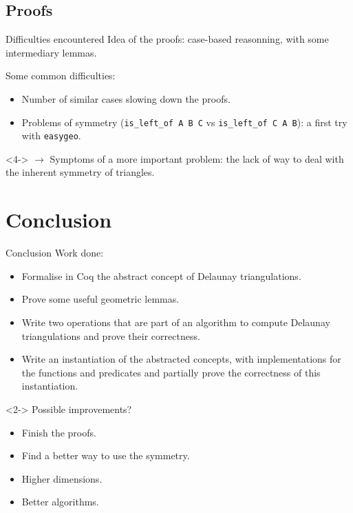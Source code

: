 \documentclass[18pt]{beamer}
\begin{document}
\subsection{Proofs}

\begin{frame}{Difficulties encountered}
Idea of the proofs: case-based reasonning, with some intermediary lemmas.

Some common difficulties:
\begin{itemize}
 \item<2-> Number of similar cases slowing down the proofs.
 \item<3-> Problems of symmetry ({\tt is\_left\_of A B C} vs {\tt is\_left\_of C A B}): a first try with {\tt easygeo}.
\end{itemize}

\begin{uncoverenv}<4->
$\rightarrow$ Symptoms of a more important problem: the lack of way to deal with the inherent symmetry of triangles.
\end{uncoverenv}


\end{frame}


\section{Conclusion}
\begin{frame}{Conclusion}
Work done:
\begin{itemize}
 \item Formalise in Coq the abstract concept of Delaunay triangulations.
 \item Prove some useful geometric lemmas.
 \item Write two operations that are part of an algorithm to compute Delaunay triangulations and prove their correctness.
 \item Write an instantiation of the abstracted concepts, with implementations for the functions and predicates and partially prove the correctness of this instantiation.
 \end{itemize}

\begin{uncoverenv}<2->
Possible improvements?
\begin{itemize}
 \item Finish the proofs.
 \item Find a better way to use the symmetry.
 \item Higher dimensions.
 \item Better algorithms.
\end{itemize}
\end{uncoverenv}

\end{frame}
\end{document}
